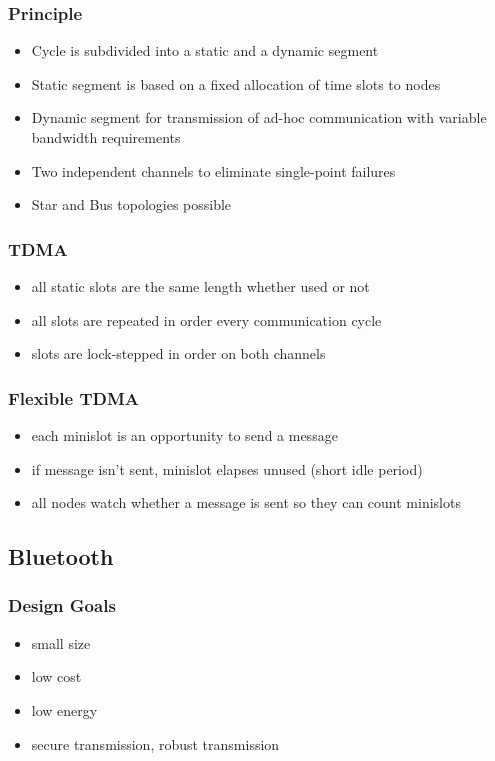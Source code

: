 \subsubsection{Principle}
\begin{itemize}[noitemsep]
\item Cycle is subdivided into a static and a dynamic segment
\item Static segment is based on a fixed allocation of time slots to nodes
\item Dynamic segment for transmission of ad-hoc communication with 
variable bandwidth requirements
\item Two independent channels to eliminate single-point failures
\item Star and Bus topologies possible
\end{itemize}

\subsubsection{TDMA}
\begin{itemize}[noitemsep]
\item all static slots are the same length whether used or not
\item all slots are repeated in order every communication cycle
\item slots are lock-stepped in order on both channels
\end{itemize}





\subsubsection{Flexible TDMA}
\begin{itemize}[noitemsep]
\item each minislot is an opportunity to send a message
\item if message isn’t sent, minislot elapses unused (short idle period)
\item all nodes watch whether a message is sent so they can count minislots
\end{itemize}


\subsection{Bluetooth}
\subsubsection{Design Goals}
\begin{itemize}[noitemsep]
\item small size
\item low cost
\item low energy
\item secure transmission, robust transmission
\end{itemize}

